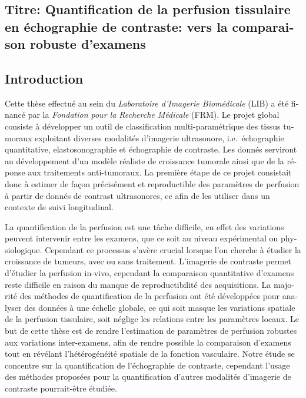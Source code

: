 \begin{otherlanguage}{french}
\subsection*{Titre: Quantification de la perfusion tissulaire en \'echographie de contraste: vers la comparaison robuste d'examens}

\subsection*{Introduction}
Cette th\`ese effectu\'e au sein du {\em Laboratoire d'Imagerie Biom\'edicale} (LIB) a \'et\'e financ\'e par la {\em Fondation pour la Recherche M\'edicale} (FRM).
Le projet global consiste \`a d\'evelopper un outil de classification multi-param\'etrique des tissus tumoraux exploitant diverses modalit\'es d'imagerie ultrasonore, i.e.~\'echographie quantitative, elastosonographie et \'echographie de contraste.
Les donn\'es serviront au d\'eveloppement d'un mod\`ele r\'ealiste de croissance tumorale ainsi que de la r\'eponse aux traitements anti-tumoraux.
La premi\`ere \'etape de ce projet consistait donc \`a estimer de fa\c{c}on pr\'ecis\'ement et reproductible des param\`etres de perfusion \`a partir de donn\'es de contrast ultrasonores, ce afin de les utiliser dans un contexte de suivi longitudinal.

La quantification de la perfusion est une t\^ache difficile, en effet des variations peuvent intervenir entre les examens, que ce soit au niveau exp\'erimental ou physiologique. 
Cependant ce processus s'av\`ere crucial lorsque l'on cherche \`a \'etudier la croissance de tumeurs, avec ou sans traitement.
L'imagerie de contraste permet d'\'etudier la perfusion in-vivo, cependant la comparaison quantitative d'examens reste difficile en raison du manque de reproductibilit\'e des acquisitions.
La majorit\'e des m\'ethodes de quantification de la perfusion ont \'et\'e d\'evelopp\'ees pour analyser des donn\'ees \`a une \'echelle globale, ce qui soit masque les variations spatiale de la perfusion tissulaire, soit n\'eglige les relations entre les param\`etres locaux.
Le but de cette th\`ese est de rendre l'estimation de param\`etres de perfusion robustes aux variations inter-examens, afin de rendre possible la comparaison d'examens tout en r\'ev\'elant l'h\'et\'erog\'en\'eit\'e spatiale de la fonction vasculaire.
Notre \'etude se concentre sur la quantification de l'\'echographie de contraste, cependant l'usage des m\'ethodes propos\'ees pour la quantification d'autres modalit\'es d'imagerie de contraste pourrait-\^etre \'etudi\'ee.


\end{otherlanguage}

